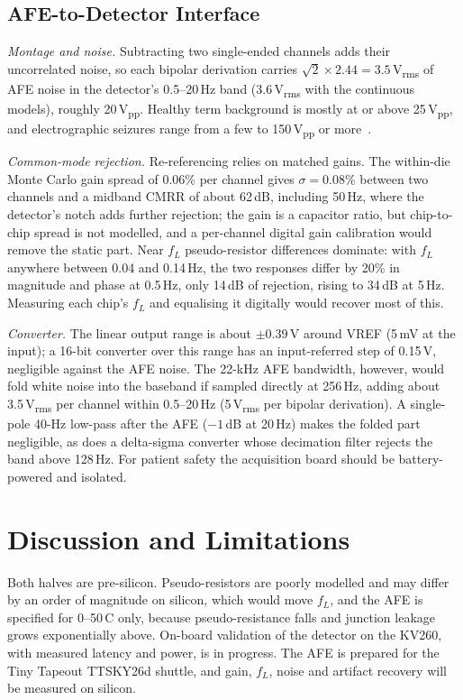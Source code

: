 \documentclass[conference]{IEEEtran}
\newcommand{\uV}{\,\textmu V}
\newcommand{\uVrms}{\,\textmu V\textsubscript{rms}}
\newcommand{\uVpp}{\,\textmu V\textsubscript{pp}}
\begin{document}
\subsection{AFE-to-Detector Interface}

\emph{Montage and noise.} Subtracting two single-ended channels adds their uncorrelated noise, so each bipolar derivation carries $\sqrt2 \times 2.44 = 3.5$\uVrms{} of AFE noise in the detector's 0.5--20\,Hz band (3.6\uVrms{} with the continuous models), roughly 20\uVpp. Healthy term background is mostly at or above 25\uVpp, and electrographic seizures range from a few to 150\uVpp{} or more~\cite{tsuchida2013}.

\emph{Common-mode rejection.} Re-referencing relies on matched gains. The within-die Monte Carlo gain spread of 0.06\% per channel gives $\sigma = 0.08$\% between two channels and a midband CMRR of about 62\,dB, including 50\,Hz, where the detector's notch adds further rejection; the gain is a capacitor ratio, but chip-to-chip spread is not modelled, and a per-channel digital gain calibration would remove the static part. Near $f_L$ pseudo-resistor differences dominate: with $f_L$ anywhere between 0.04 and 0.14\,Hz, the two responses differ by 20\% in magnitude and phase at 0.5\,Hz, only 14\,dB of rejection, rising to 34\,dB at 5\,Hz. Measuring each chip's $f_L$ and equalising it digitally would recover most of this.

\emph{Converter.} The linear output range is about $\pm0.39$\,V around VREF (5\,mV at the input); a 16-bit converter over this range has an input-referred step of 0.15\uV, negligible against the AFE noise. The 22-kHz AFE bandwidth, however, would fold white noise into the baseband if sampled directly at 256\,Hz, adding about 3.5\uVrms{} per channel within 0.5--20\,Hz (5\uVrms{} per bipolar derivation). A single-pole 40-Hz low-pass after the AFE ($-1$\,dB at 20\,Hz) makes the folded part negligible, as does a delta-sigma converter whose decimation filter rejects the band above 128\,Hz. For patient safety the acquisition board should be battery-powered and isolated.

\section{Discussion and Limitations}

Both halves are pre-silicon. Pseudo-resistors are poorly modelled and may differ by an order of magnitude on silicon, which would move $f_L$, and the AFE is specified for 0--50\,\textdegree C only, because pseudo-resistance falls and junction leakage grows exponentially above. On-board validation of the detector on the KV260, with measured latency and power, is in progress. The AFE is prepared for the Tiny Tapeout TTSKY26d shuttle, and gain, $f_L$, noise and artifact recovery will be measured on silicon.
\end{document}
